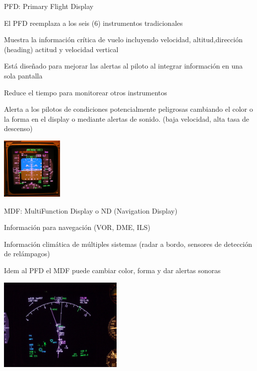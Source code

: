 \begin{frame}

     \begin{block}{ PFD: Primary Flight Display}
{\footnotesize
	
	

	El PFD reemplaza a los seis (6) instrumentos tradicionales

	Muestra la informaci\'on cr\'itica de vuelo 
	incluyendo velocidad, altitud,direcci\'on (heading)
	actitud y velocidad vertical

	Est\'a dise\~nado para mejorar las alertas al piloto
	al integrar informaci\'on en una sola pantalla

	Reduce el tiempo para monitorear otros instrumentos

	Alerta a los pilotos de condiciones potencialmente peligrosas
        cambiando el color o la forma en el display o mediante alertas
        de sonido. (baja velocidad, alta tasa de descenso) 
}
    \end{block}

 \includegraphics[width=3cm]{imagenes/1.4.pantalla.electronica/Primary_Flight_Display,_Boeing_747-400.png}\\
 

    \end{frame}      
    
\begin{frame}

  \begin{block}{ MDF: MultiFunction Display o ND (Navigation Display)}

    Informaci\'on para navegaci\'on (VOR, DME, ILS)

    Informaci\'on clim\'atica de m\'ultiples sistemas (radar a bordo,
    sensores de detecci\'on de rel\'ampagos)

    Idem al PFD el MDF puede cambiar color, forma y dar alertas
    sonoras

    \includegraphics[width=6cm]{imagenes/1.4.pantalla.electronica/Navigation_Display_(ND)_on_Boeing_747-400.jpg}
  \end{block}
    \end{frame}      
    
